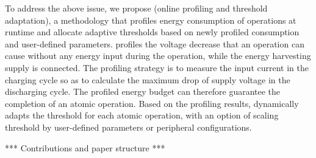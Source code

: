 
To address the above issue, we propose \nn{} (online profiling and threshold adaptation), a methodology that profiles energy consumption of operations at runtime and allocate adaptive thresholds based on newly profiled consumption and user-defined parameters. 
\nn{} profiles the voltage decrease that an operation can cause without any energy input during the operation, while the energy harvesting supply is connected. 
The profiling strategy is to measure the input current in the charging cycle so as to calculate the maximum drop of supply voltage in the discharging cycle. 
The profiled energy budget can therefore guarantee the completion of an atomic operation. 
Based on the profiling results, \nn{} dynamically adapts the threshold for each atomic operation, with an option of scaling threshold by user-defined parameters or peripheral configurations.



*** Contributions and paper structure ***


